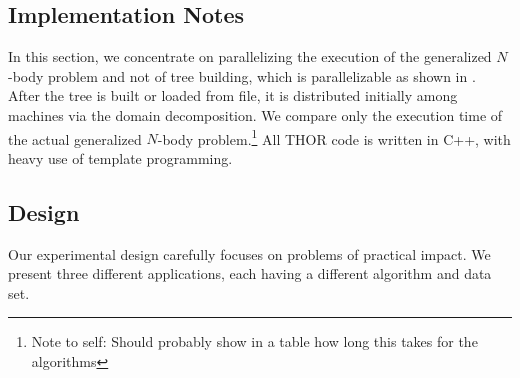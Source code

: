 \documentclass[twoside,leqno,twocolumn]{article}
\newcommand{\authornote}[1]{\footnote{Note to self: #1}}
\newcommand{\authorsnote}[1]{\authornote{#1}}
\begin{document}
\subsection{Implementation Notes}

In this section, we concentrate on parallelizing the execution of the generalized $N$-body problem and not of tree building, which is parallelizable as shown in \cite{alfuraih00parallel}.
After the tree is built or loaded from file, it is distributed initially among machines via the domain decomposition.
We compare only the execution time of the actual generalized $N$-body problem.\authorsnote{Should probably show in a table how long this takes for the algorithms}
All THOR code is written in C++, with heavy use of template programming.

\subsection{Design}


Our experimental design carefully focuses on problems of practical impact.
We present three different applications, each having a different algorithm and data set.

%
%
%
\end{document}
